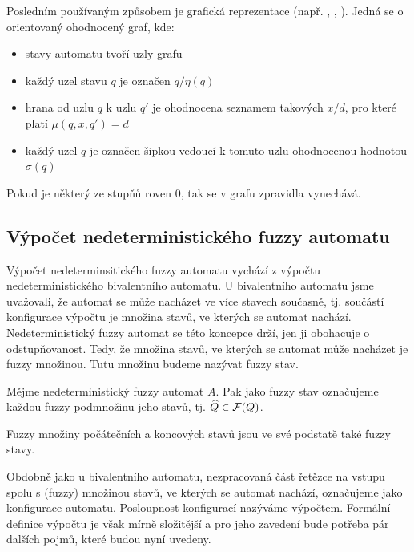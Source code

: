 \documentclass[a4paper,10pt]{article}
\begin{document}
Posledním používaným způsobem je grafická reprezentace (např. \cite{DooKre-NewDirFuzzAut}, \cite{GonGar-FuzzLangInfRanAccGuzzAutPumLemDetProc}, \cite{StaCir-ConsFuzzAutFuzzRegExp}). Jedná se o orientovaný ohodnocený graf, kde:
\begin{itemize}
 \item stavy automatu tvoří uzly grafu
 \item každý uzel stavu $q$ je označen $q/\eta(q)$
 \item hrana od uzlu $q$ k uzlu $q'$ je ohodnocena seznamem takových $x/d$, pro které platí $\mu(q, x, q') = d$
 \item každý uzel $q$ je označen šipkou vedoucí k tomuto uzlu ohodnocenou hodnotou $\sigma(q)$
\end{itemize}

Pokud je některý ze stupňů roven $0$, tak se v grafu zpravidla vynechává.

\begin{example}
\end{example}

\subsection{Výpočet nedeterministického fuzzy automatu}
Výpočet nedeterminsitického fuzzy automatu vychází z výpočtu nedeterministického bivalentního automatu. U bivalentního automatu jsme uvažovali, že automat se může nacházet ve více stavech současně, tj. součástí konfigurace výpočtu je množina stavů, ve kterých se automat nachází. Nedeterministický fuzzy automat se této koncepce drží, jen ji obohacuje o odstupňovanost. Tedy, že množina stavů, ve kterých se automat může nacházet je fuzzy množinou. Tutu množinu budeme nazývat fuzzy stav.

\begin{definition}\label{def-FuzzStav}
 Mějme nedeterministický fuzzy automat $A$. Pak jako fuzzy stav označujeme každou fuzzy podmnožinu jeho stavů, tj. $\widehat{Q} \in \mathcal{F}(Q)$.
\end{definition}

\begin{note}
 Fuzzy množiny počátečních a koncových stavů jsou ve své podstatě také fuzzy stavy.
\end{note}

Obdobně jako u bivalentního automatu, nezpracovaná část řetězce na vstupu spolu s (fuzzy) množinou stavů, ve kterých se automat nachází, označujeme jako konfigurace automatu. Posloupnost konfigurací nazýváme výpočtem. Formální definice výpočtu je však mírně složitější a pro jeho zavedení bude potřeba pár dalších pojmů, které budou nyní uvedeny.
\end{document}
